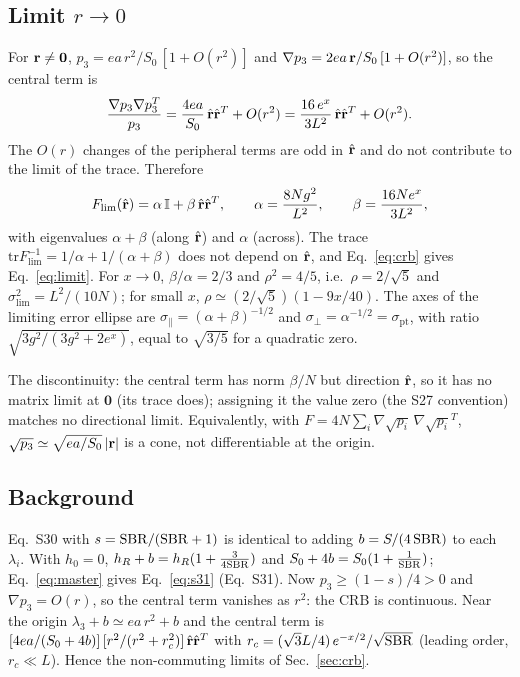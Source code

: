 \subsection{Limit $r\to0$}
For $\mathbf{r}\neq\mathbf0$, $p_3=ea\,r^2/S_0\,[1+O(r^2)]$ and $\nabla p_3=2ea\,\mathbf{r}/S_0\,[1+O(r^2)]$, so
the central term is
\begin{equation}
\frac{\nabla p_3\nabla p_3^{T}}{p_3}=\frac{4ea}{S_0}\,\hat{\mathbf{r}}\hat{\mathbf{r}}^{T}+O(r^2)
=\frac{16\,e^{x}}{3L^2}\,\hat{\mathbf{r}}\hat{\mathbf{r}}^{T}+O(r^2).
\end{equation}
The $O(r)$ changes of the peripheral terms are odd in $\hat{\mathbf{r}}$ and do not contribute to the limit
of the trace. Therefore
\begin{equation}
F_{\lim}(\hat{\mathbf{r}})=\alpha\,\mathbb{I}+\beta\,\hat{\mathbf{r}}\hat{\mathbf{r}}^{T},\qquad
\alpha=\frac{8Ng^2}{L^2},\qquad\beta=\frac{16Ne^{x}}{3L^2},
\label{eq:alphabeta}
\end{equation}
with eigenvalues $\alpha+\beta$ (along $\hat{\mathbf{r}}$) and $\alpha$ (across). The trace
$\mathrm{tr}F_{\lim}^{-1}=1/\alpha+1/(\alpha+\beta)$ does not depend on $\hat{\mathbf{r}}$, and
Eq.~\eqref{eq:crb} gives Eq.~\eqref{eq:limit}. For $x\to0$, $\beta/\alpha=2/3$ and
$\rho^2=4/5$, i.e.\ $\rho=2/\sqrt5$ and $\sigma_{\lim}^2=L^2/(10N)$; for small $x$,
$\rho\simeq(2/\sqrt5)(1-9x/40)$. The axes of the limiting error ellipse are
$\sigma_\parallel=(\alpha+\beta)^{-1/2}$ and $\sigma_\perp=\alpha^{-1/2}=\sigma_{\mathrm{pt}}$,
with ratio $\sqrt{3g^2/(3g^2+2e^{x})}$, equal to $\sqrt{3/5}$ for a quadratic zero.

The discontinuity: the central term has norm $\beta/N$ but direction
$\hat{\mathbf{r}}$, so it has no matrix limit at $\mathbf0$ (its trace does); assigning it the value zero
(the S27 convention) matches no directional limit. Equivalently, with
$F=4N\sum_i\nabla\sqrt{p_i}\,\nabla\sqrt{p_i}^{T}$, $\sqrt{p_3}\simeq\sqrt{ea/S_0}\,|\mathbf{r}|$ is a
cone, not differentiable at the origin.

\subsection{Background}
Eq.~S30 with $s=\mathrm{SBR}/(\mathrm{SBR}+1)$ is identical to adding $b=S/(4\,\mathrm{SBR})$ to each $\lambda_i$. With
$h_0=0$, $h_R+b=h_R(1+\tfrac{3}{4\mathrm{SBR}})$ and $S_0+4b=S_0(1+\tfrac{1}{\mathrm{SBR}})$; Eq.~\eqref{eq:master}
gives Eq.~\eqref{eq:s31} (Eq.~S31). Now $p_3\ge(1-s)/4>0$ and $\nabla p_3=O(r)$, so the central
term vanishes as $r^2$: the CRB is continuous. Near the origin
$\lambda_3+b\simeq ea\,r^2+b$ and the central term is
$[4ea/(S_0+4b)]\,[r^2/(r^2+r_c^2)]\,\hat{\mathbf{r}}\hat{\mathbf{r}}^{T}$ with
$r_c=(\sqrt3L/4)\,e^{-x/2}/\sqrt{\mathrm{SBR}}$ (leading order, $r_c\ll L$). Hence the non-commuting
limits of Sec.~\ref{sec:crb}.

